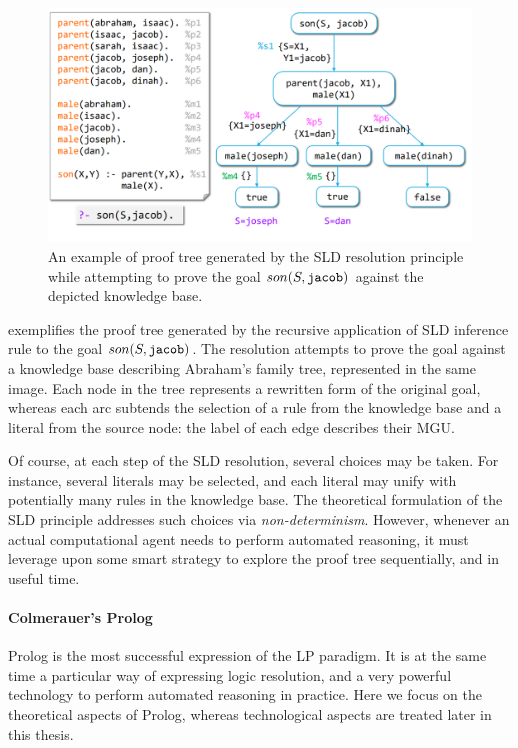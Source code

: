 \documentclass[12pt,a4paper,openright,twoside]{book}
\begin{document}
\begin{figure}
    \centering
    \includegraphics[width=\linewidth]{figures/proof-tree.png}
    \caption{An example of proof tree generated by the SLD resolution principle while attempting to prove the goal $son(S, \mathtt{jacob})$ against the depicted knowledge base. }
    \label{fig:proof-tree}
\end{figure}

 exemplifies the proof tree generated by the recursive application of SLD inference rule to the goal $son(S, \mathtt{jacob})$.
%
The resolution attempts to prove the goal against a knowledge base describing Abraham's family tree, represented in the same image.
%
Each node in the tree represents a rewritten form of the original goal, whereas each arc subtends the selection of a rule from the knowledge base and a literal from the source node: the label of each edge describes their MGU.

Of course, at each step of the SLD resolution, several choices may be taken.
%
For instance, several literals may be selected, and each literal may unify with potentially many rules in the knowledge base.
%
The theoretical formulation of the SLD principle addresses such choices via \emph{non-determinism}.
%
However, whenever an actual computational agent needs to perform automated reasoning, it must leverage upon some smart strategy to explore the proof tree sequentially, and in useful time.

\paragraph{Colmerauer's Prolog}

Prolog \cite{ColmerauerR93} is the most successful expression of the LP paradigm.
%
It is at the same time a particular way of expressing logic resolution, and a very powerful technology to perform automated reasoning in practice.
%
Here we focus on the theoretical aspects of Prolog, whereas technological aspects are treated later in this thesis.
\end{document}
